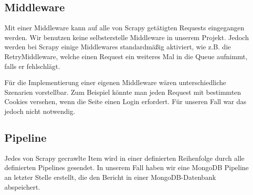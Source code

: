 \subsection{Middleware}

Mit einer Middleware kann auf alle von Scrapy getätigten Requests eingegangen werden. Wir benutzen keine selbsterstelle
Middleware in unserem Projekt. Jedoch werden bei Scrapy einige Middlewares standardmäßig aktiviert, wie z.B.
die RetryMiddleware, welche einen Request ein weiteres Mal in die Queue aufnimmt, falls er fehlschlägt.

Für die Implementierung einer eigenen Middleware wären unterschiedliche Szenarien vorstellbar. Zum Beispiel könnte man
jeden Request mit bestimmten Cookies versehen, wenn die Seite einen Login erfordert. Für unseren Fall war das jedoch nicht
notwendig.

\subsection{Pipeline}

Jedes von Scrapy gecrawlte Item wird in einer definierten Reihenfolge durch alle definierten Pipelines gesendet.
In unserem Fall haben wir eine MongoDB Pipeline an letzter Stelle erstellt, die den Bericht in einer MongoDB-Datenbank abspeichert.
